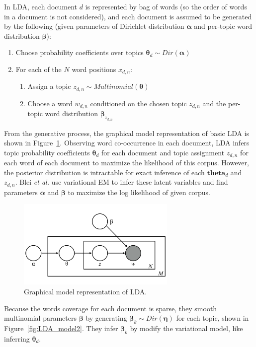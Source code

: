 In LDA, each document $d$ is represented by bag of words (so the order of words in a document is not considered), and each document is assumed to be generated by the following (given parameters of Dirichlet distribution $\boldsymbol{\alpha}$ and per-topic word distribution $\boldsymbol{\beta}$):
\begin{enumerate}[]
	\item Choose probability coefficients over topics $\boldsymbol{\theta}_d {\sim} Dir(\boldsymbol{\alpha})$
	\item For each of the $N$ word positions $x_{d,n}$:
	\begin{enumerate}
		\item Assign a topic $z_{d,n} {\sim} Multinomial(\boldsymbol{\theta})$
		\item Choose a word $w_{d,n}$ conditioned on the chosen topic $z_{d,n}$ and the per-topic word distribution $\boldsymbol{\beta}_{z_{d,n}}$
	\end{enumerate}
\end{enumerate}

From the generative process, the graphical model representation of basic LDA is shown in Figure~\ref{fig:LDA_model}. Observing word co-occurrence in each document, LDA infers topic probability coefficients $\boldsymbol{\theta}_d$ for each document and topic assignment $z_{d,n}$ for each word of each document to maximize the likelihood of this corpus. However, the posterior distribution is intractable for exact inference of each $\boldsymbol{theta}_d$ and $z_{d,n}$. Blei {\it et al.} use variational EM to infer these latent variables and find parameters $\boldsymbol{\alpha}$ and $\boldsymbol{\beta}$ to maximize the log likelihood of given corpus.

\begin{figure}[!t]
\centering
\includegraphics[width=3in]{fig/LDA_model.png}
\caption{Graphical model representation of LDA.}
\label{fig:LDA_model}
\end{figure}

Because the words coverage for each document is sparse, they smooth multinomial parameters $\boldsymbol{\beta}$ by generating $\boldsymbol{\beta}_k \sim Dir(\boldsymbol{\eta})$ for each topic, shown in Figure~\ref{fig:LDA_model2}. They infer $\boldsymbol{\beta}_k$ by modify the variational model, like inferring $\boldsymbol{\theta}_d$.

